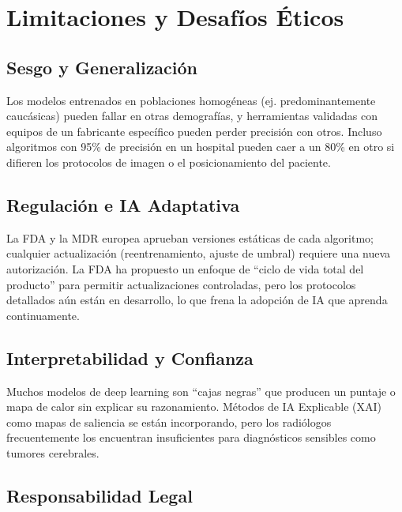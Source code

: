 \section{Limitaciones y Desafíos Éticos}

\subsection{Sesgo y Generalización}

Los modelos entrenados en poblaciones homogéneas (ej. predominantemente caucásicas) pueden fallar en otras demografías, y herramientas validadas con equipos de un fabricante específico pueden perder precisión con otros. Incluso algoritmos con 95\% de precisión en un hospital pueden caer a un 80\% en otro si difieren los protocolos de imagen o el posicionamiento del paciente.

\subsection{Regulación e IA Adaptativa}

La FDA y la MDR europea aprueban versiones estáticas de cada algoritmo; cualquier actualización (reentrenamiento, ajuste de umbral) requiere una nueva autorización. La FDA ha propuesto un enfoque de ``ciclo de vida total del producto'' para permitir actualizaciones controladas, pero los protocolos detallados aún están en desarrollo, lo que frena la adopción de IA que aprenda continuamente.

\subsection{Interpretabilidad y Confianza}

Muchos modelos de deep learning son ``cajas negras'' que producen un puntaje o mapa de calor sin explicar su razonamiento. Métodos de IA Explicable (XAI) como mapas de saliencia se están incorporando, pero los radiólogos frecuentemente los encuentran insuficientes para diagnósticos sensibles como tumores cerebrales.

\subsection{Responsabilidad Legal}

